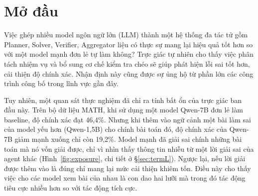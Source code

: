 \documentclass[11pt,a4paper]{article}
\begin{document}
\vfill
\newpage

\begin{abstract}
Các hệ thống LLM đa tác tử ngày càng được quan tâm vì cho phép phân chia nhiệm vụ giữa nhiều vai
trò như lập kế hoạch, giải bài, kiểm tra và tổng hợp, với kỳ vọng hiệu quả hơn một model đơn lẻ.
Tuy nhiên, giá trị thực sự của cơ chế phối hợp vẫn khó đánh giá do khác biệt về ngân sách tính
toán, model đối chứng và phạm vi tác động. Trong báo cáo này, chúng tôi xây dựng một khung thực
nghiệm thống nhất trên các benchmark suy luận và lập trình để phân tích đóng góp của từng vai
trò, tác động của việc đưa lời giải giữa các model và khả năng học đúng chức năng qua huấn
luyện. Kết quả cho thấy phần lớn lợi ích suy giảm hoặc biến mất dưới các điều kiện so sánh công
bằng; đặc biệt, lời giải sai của model yếu có thể làm giảm mạnh hiệu quả của model mạnh, trong
khi tín hiệu kiểm chứng khách quan đáng tin cậy hơn việc để model tự đánh giá. Nhìn chung, phối
hợp đa tác tử không mặc định tạo ra lợi ích mà phụ thuộc vào năng lực model, cách tổ chức thông
tin và cơ chế lựa chọn, kiểm chứng lời giải.
\end{abstract}

\section{Mở đầu}\label{sec:intro}

Việc ghép nhiều model ngôn ngữ lớn (LLM) thành một hệ thống đa tác tử gồm Planner, Solver, Verifier, Aggregator liệu có thực sự mang lại hiệu quả tốt hơn so với một model mạnh đơn lẻ tự làm không? Trực giác tự nhiên cho thấy việc phân tách nhiệm vụ và bổ sung cơ chế kiểm tra chéo sẽ giúp phát hiện lỗi sai tốt hơn, cải thiện độ chính xác. Nhận định này cũng được sự ủng hộ từ phần lớn các công trình công bố trong lĩnh vực gần đây.

Tuy nhiên, một quan sát thực nghiệm đã chỉ ra tính bất ổn của trực giác ban đầu này. Trên bộ dữ liệu MATH, khi sử dụng một model Qwen-7B đơn lẻ làm baseline, độ chính xác đạt 46,4\%. Nhưng khi thêm vào ngữ cảnh một bài làm sai của model yếu hơn (Qwen-1,5B) cho chính bài toán đó, độ chính xác của Qwen-7B giảm mạnh xuống chỉ còn 19,2\%. Model mạnh đã giải sai chính những bài toán mà nó vốn giải được, chỉ vì nhìn thấy thông tin nhiễu từ một lời giải sai của agent khác
(Hình~\ref{fig:exposure}, chi tiết ở \S\ref{sec:termL}). Ngược lại, nếu lời giải được thêm vào là đúng chỉ mang lại mức cải thiện khiêm tốn. Điều này cho thấy việc cho các model xem bài của nhau là con dao hai lưỡi mà trong đó tác động tiêu cực nhiều hơn so với tác động tích cực.
\end{document}
